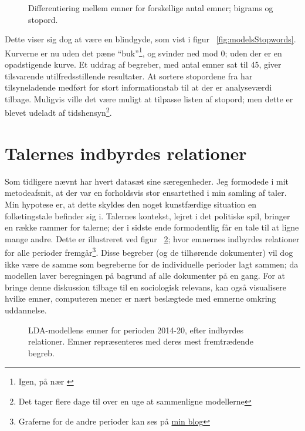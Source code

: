 \begin{figure}

\caption{Differentiering mellem emner for forskellige antal emner; bigrams og stopord.}
\label{fig:models_stopwords}
\end{figure}

Dette viser sig dog at være en blindgyde, som vist i figur ~\ref{fig:modelsStopwords}.
Kurverne er nu uden det pæne “buk”\footnote{Igen, på nær \autocite{deveaudAccurateEffectiveLatent2014}}, og svinder ned mod 0; uden der er en opadstigende kurve.
Et uddrag af begreber, med antal emner sat til 45, giver tilsvarende utilfredsstillende resultater.
At sortere stopordene fra har tilsyneladende medført for stort informationstab til at der er analyseværdi tilbage.
Muligvis ville det være muligt at tilpasse listen af stopord; men dette er blevet udeladt af tidshensyn\footnote{Det tager flere dage til over en uge at sammenligne modellerne}.

\section{Talernes indbyrdes relationer}
Som tidligere nævnt har hvert datasæt sine særegenheder.
Jeg formodede i mit metodeafsnit, at der var en forholdsvis stor ensartethed i min samling af taler.
Min hypotese er, at dette skyldes den noget kunstfærdige situation en folketingstale befinder sig i.
Talernes kontekst, lejret i det politiske spil, bringer en række rammer for talerne; der i sidste ende formodentlig får en tale til at ligne mange andre.
Dette er illustreret ved figur ~\ref{fig:dendro_all}; hvor emnernes indbyrdes relationer for alle perioder fremgår\footnote{Graferne for de andre perioder kan ses på \href{martinandreasandersen.com/projects/au/}{min blog}}.
Disse begreber (og de tilhørende dokumenter) vil dog ikke være de samme som begreberne for de individuelle perioder lagt sammen; da modellen laver beregningen på bagrund af alle dokumenter på en gang.
For at bringe denne diskussion tilbage til en sociologisk relevans, kan også visualisere hvilke emner, computeren mener er nært beslægtede med emnerne omkring uddannelse.

\begin{figure}
  
  \caption{LDA-modellens emner for perioden 2014-20, efter indbyrdes relationer. Emner repræsenteres med deres mest fremtrædende begreb.}
\label{fig:dendro_all}
\end{figure}

